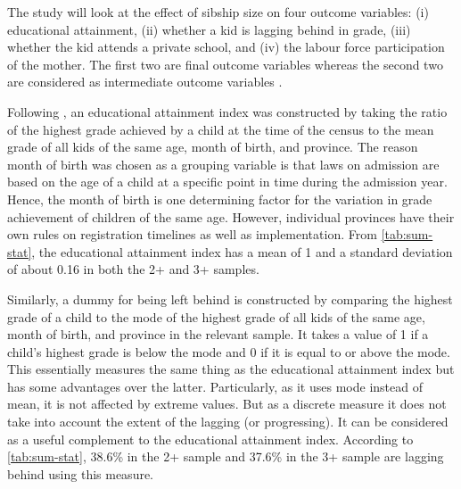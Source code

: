
The study will look at the effect of sibship size on four outcome variables: (i) educational attainment, (ii) whether a kid is lagging behind in grade, (iii) whether the kid attends a private school, and (iv) the labour force participation of the mother. The first two are final outcome variables whereas the second two are considered as intermediate outcome variables \parencite{caceres-delpiano_impacts_2006}. 

Following \textcite{rosenzweig_testing_1980}, an educational attainment index was constructed by taking the ratio of the highest grade achieved by a child at the time of the census to the mean grade of all kids of the same age, month of birth, and province. The reason month of birth was chosen as a grouping variable is that laws on admission are based on the age of a child at a specific point in time during the admission year.  Hence, the month of birth is one determining factor for the variation in grade achievement of children of the same age. However, individual provinces have their own rules on registration timelines as well as implementation. From \autoref{tab:sum-stat}, the educational attainment index has a mean of 1 and a standard deviation of about 0.16 in both the 2+ and 3+ samples. %

Similarly, a dummy for being left behind is constructed by comparing the highest grade of a child to the mode of the highest grade of all kids of the same age, month of birth, and province in the relevant sample. It takes a value of 1 if a child's highest grade is below the mode and 0 if it is equal to or above the mode. This essentially measures the same thing as the educational attainment index but has some advantages over the latter. Particularly, as it uses mode instead of mean, it is not affected by extreme values. But as a discrete measure it does not take into account the extent of the lagging (or progressing). It can be considered as a useful complement to the educational attainment index. According to \autoref{tab:sum-stat}, 38.6\% in the 2+ sample and 37.6\% in the 3+ sample are lagging behind using this measure. 


